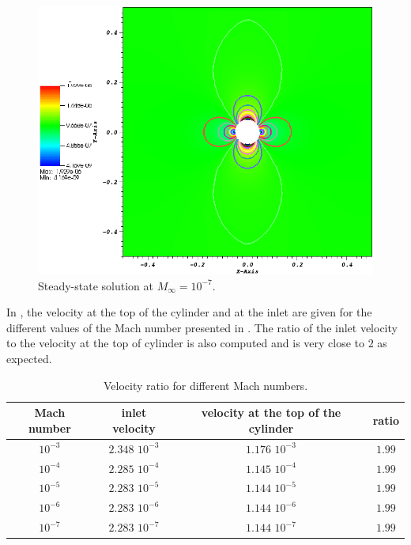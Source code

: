         \begin{figure}[H]%
                \centering
                \includegraphics[scale=.50]{figures/CylinderMach1em7.png}
                \caption{Steady-state solution at $M_{\infty}=10^{-7}$.}
                \label{fig:cyl_1em7}
        \end{figure}
In , the velocity at the top of the cylinder and at the inlet are given for the different values of the Mach number presented in . The ratio of the inlet velocity to the velocity at the top of cylinder is also computed and is very close to $2$ as expected.
\begin{table}[H]
\begin{center}
 \caption{\label{tbl:velocity_ratio}Velocity ratio for different Mach numbers.}
\begin{tabular}{|c|c|c|c|}
\hline
Mach number & inlet velocity & velocity at the top of the cylinder & ratio \\ \hline
$10^{-3}$ & $2.348$ $10^{-3}$ & $1.176$ $10^{-3}$& $1.99$ \\ \hline
$10^{-4}$ & $2.285$ $10^{-4}$ & $1.145$ $10^{-4}$& $1.99$ \\ \hline
$10^{-5}$ & $2.283$ $10^{-5}$ & $1.144$ $10^{-5}$ & $1.99$ \\ \hline
$10^{-6}$ & $2.283$ $10^{-6}$ & $1.144$ $10^{-6}$ & $1.99$ \\ \hline
$10^{-7}$ & $2.283$ $10^{-7}$ & $1.144$ $10^{-7}$ & $1.99$ \\ \hline
\end{tabular}
\end{center}
\nonumber
\end{table}
